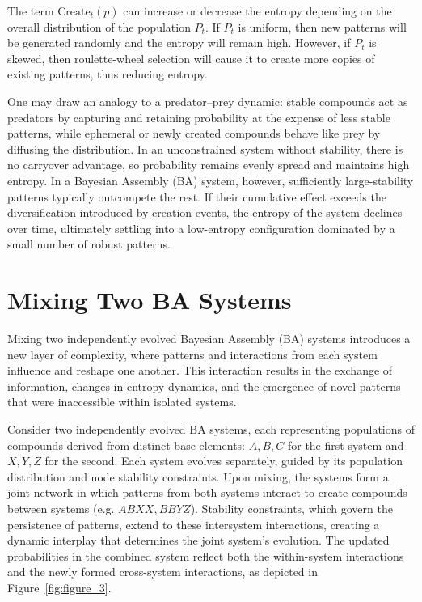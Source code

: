 \documentclass[preprint,12pt]{elsarticle}
\begin{document}
The term $\mathrm{Create}_t(p)$ can increase or decrease the entropy depending on the overall distribution of the population $P_t$. If $P_t$ is uniform, then new patterns will be generated randomly and the entropy will remain high. However, if $P_t$ is skewed, then roulette-wheel selection will cause it to create more copies of existing patterns, thus reducing entropy.

One may draw an analogy to a predator–prey dynamic: stable compounds act as predators by capturing and retaining probability at the expense of less stable patterns, while ephemeral or newly created compounds behave like prey by diffusing the distribution. In an unconstrained system without stability, there is no carryover advantage, so probability remains evenly spread and maintains high entropy. In a Bayesian Assembly (BA) system, however, sufficiently large-stability patterns typically outcompete the rest. If their cumulative effect exceeds the diversification introduced by creation events, the entropy of the system declines over time, ultimately settling into a low-entropy configuration dominated by a small number of robust patterns.

\section{Mixing Two BA Systems}

Mixing two independently evolved Bayesian Assembly (BA) systems introduces a new layer of complexity, where patterns and interactions from each system influence and reshape one another. This interaction results in the exchange of information, changes in entropy dynamics, and the emergence of novel patterns that were inaccessible within isolated systems.

Consider two independently evolved BA systems, each representing populations of compounds derived from distinct base elements: \( A, B, C\) for the first system and \( X, Y, Z\) for the second. Each system evolves separately, guided by its population distribution and node stability constraints. Upon mixing, the systems form a joint network in which patterns from both systems interact to create compounds between systems (e.g. \( ABXX, BBYZ \)). Stability constraints, which govern the persistence of patterns, extend to these intersystem interactions, creating a dynamic interplay that determines the joint system's evolution. The updated probabilities in the combined system reflect both the within-system interactions and the newly formed cross-system interactions, as depicted in Figure~\ref{fig:figure_3}.
\end{document}
